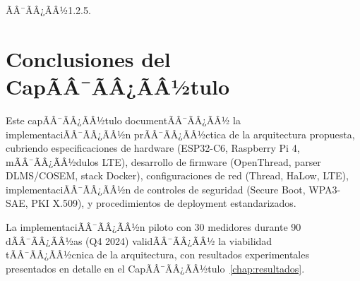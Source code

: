 ÃÂ¯ÃÂ¿ÃÂ½1.2.5.\n\n\section{Conclusiones del CapÃÂ¯ÃÂ¿ÃÂ½tulo}\n\label{sec:impl-conclusiones}

Este capÃÂ¯ÃÂ¿ÃÂ½tulo documentÃÂ¯ÃÂ¿ÃÂ½ la implementaciÃÂ¯ÃÂ¿ÃÂ½n prÃÂ¯ÃÂ¿ÃÂ½ctica de la arquitectura propuesta, cubriendo especificaciones de hardware (ESP32-C6, Raspberry Pi 4, mÃÂ¯ÃÂ¿ÃÂ½dulos LTE), desarrollo de firmware (OpenThread, parser DLMS/COSEM, stack Docker), configuraciones de red (Thread, HaLow, LTE), implementaciÃÂ¯ÃÂ¿ÃÂ½n de controles de seguridad (Secure Boot, WPA3-SAE, PKI X.509), y procedimientos de deployment estandarizados.

La implementaciÃÂ¯ÃÂ¿ÃÂ½n piloto con 30 medidores durante 90 dÃÂ¯ÃÂ¿ÃÂ½as (Q4 2024) validÃÂ¯ÃÂ¿ÃÂ½ la viabilidad tÃÂ¯ÃÂ¿ÃÂ½cnica de la arquitectura, con resultados experimentales presentados en detalle en el CapÃÂ¯ÃÂ¿ÃÂ½tulo~\ref{chap:resultados}.


